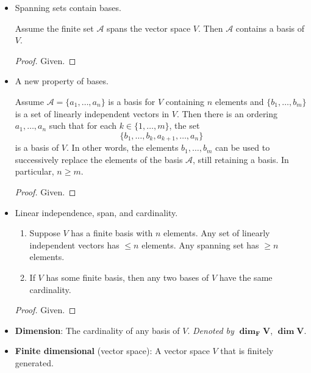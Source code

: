 \documentclass[../notes.tex]{subfiles}
\begin{document}
\begin{itemize}
    \item Spanning sets contain bases.
    \begin{corollary}\label{cly:11.2}
        Assume the finite set $\mathcal{A}$ spans the vector space $V$. Then $\mathcal{A}$ contains a basis of $V$.
        \begin{proof}
            Given.
        \end{proof}
    \end{corollary}
    \item A new property of bases.
    \begin{theorem}\label{trm:11.3}
        Assume $\mathcal{A}=\{a_1,\dots,a_n\}$ is a basis for $V$ containing $n$ elements and $\{b_1,\dots,b_m\}$ is a set of linearly independent vectors in $V$. Then there is an ordering $a_1,\dots,a_n$ such that for each $k\in\{1,\dots,m\}$, the set
        \begin{equation*}
            \{b_1,\dots,b_k,a_{k+1},\dots,a_n\}
        \end{equation*}
        is a basis of $V$. In other words, the elements $b_1,\dots,b_m$ can be used to successively replace the elements of the basis $\mathcal{A}$, still retaining a basis. In particular, $n\geq m$.
        \begin{proof}
            Given.
        \end{proof}
    \end{theorem}
    \item Linear independence, span, and cardinality.
    \begin{corollary}\label{cly:11.4}\leavevmode
        \begin{enumerate}
            \item Suppose $V$ has a finite basis with $n$ elements. Any set of linearly independent vectors has $\leq n$ elements. Any spanning set has $\geq n$ elements.
            \item If $V$ has some finite basis, then any two bases of $V$ have the same cardinality.
        \end{enumerate}
        \begin{proof}
            Given.
        \end{proof}
    \end{corollary}
    \item \textbf{Dimension}: The cardinality of any basis of $V$. \emph{Denoted by} $\bm{\dim_FV}$, $\bm{\dim V}$.
    \item \textbf{Finite dimensional} (vector space): A vector space $V$ that is finitely generated.

\end{itemize}
\end{document}
